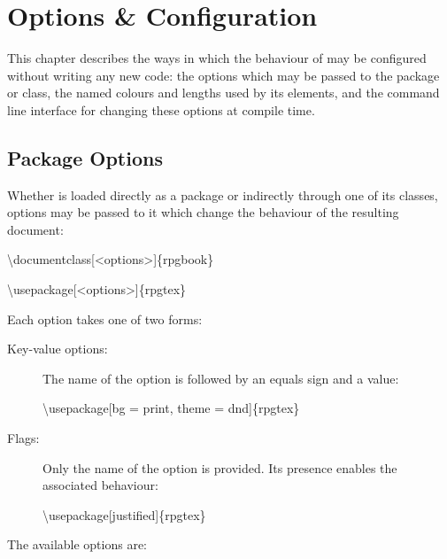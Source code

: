 \chapter{Options \& Configuration}

	This chapter describes the ways in which the behaviour of \rpgtex{} may be configured without writing any new code: the options which may be passed to the package or class, the named colours and lengths used by its elements, and the command line interface for changing these options at compile time.


	\section{Package Options}\label{S:PackageOptions}
		Whether \rpgtex{} is loaded directly as a package or indirectly through one of its classes, options may be passed to it which change the behaviour of the resulting document:
		\begin{Code}
			\textbackslash{}documentclass[<options>]\{rpgbook\}

			\textbackslash{}usepackage[<options>]\{rpgtex\}
		\end{Code}
		Each option takes one of two forms:

		\begin{description}
			\item[Key-value options:] The name of the option is followed by an equals sign and a value:
			      \begin{Code}
				      \textbackslash{}usepackage[bg = print, theme = dnd]\{rpgtex\}
			      \end{Code}
			\item[Flags:] Only the name of the option is provided. Its presence enables the associated behaviour:
			      \begin{Code}
				      \textbackslash{}usepackage[justified]\{rpgtex\}
			      \end{Code}
		\end{description}

		The available options are:

